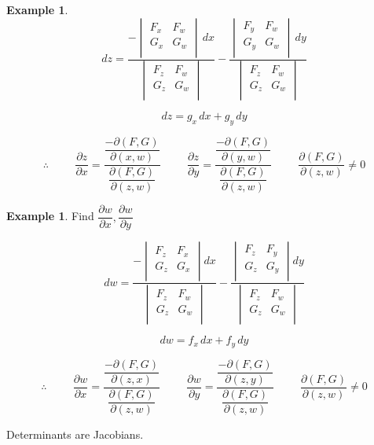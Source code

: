 \documentclass[11pt,a4paper]{article}
\theoremstyle{definition}
\newtheorem{exa}[thm]{Example}
\begin{document}
\begin{exa}
$$dz = \frac{
-\begin{vmatrix}
F_x & F_w\\
G_x & G_w\\
\end{vmatrix}
\,dx}{
\begin{vmatrix}
F_z & F_w\\
G_z & G_w\\
\end{vmatrix}
}-\frac{
\begin{vmatrix}
F_y & F_w\\
G_y & G_w\\
\end{vmatrix}
\,dy
}{
\begin{vmatrix}
F_z & F_w\\
G_z & G_w\\
\end{vmatrix}
}
$$

$$dz = g_x \,dx + g_y\,dy$$

$$\therefore\hspace{1cm} \frac{\partial z}{\partial x} = \frac{\dfrac{-\partial (F,G)}{\partial (x,w)}}{\dfrac{\partial (F,G)}{\partial (z,w)}}\hspace{1cm}
\frac{\partial z}{\partial y}= \frac{\dfrac{-\partial (F,G)}{\partial (y,w)}}{\dfrac{\partial (F,G)}{\partial (z,w)}}\hspace{1cm} \frac{\partial (F,G)}{\partial (z,w)} \neq 0$$
\end{exa}


\begin{exa}


Find $\dfrac{\partial w}{\partial x}, \dfrac{\partial w}{\partial y}$

$$dw = \frac{
-\begin{vmatrix}
F_z & F_x\\
G_z & G_x\\
\end{vmatrix}
dx}{
\begin{vmatrix}
F_z & F_w\\
G_z & G_w\\
\end{vmatrix}
}-\frac{
\begin{vmatrix}
F_z & F_y\\
G_z & G_y\\
\end{vmatrix}
dy
}{
\begin{vmatrix}
F_z & F_w\\
G_z & G_w\\
\end{vmatrix}
}
$$

$$dw = f_x\,dx + f_y \,dy$$

$$\therefore\hspace{1cm} \frac{\partial w}{\partial x} = \frac{\dfrac{-\partial (F,G)}{\partial (z,x)}}{\dfrac{\partial (F,G)}{\partial (z,w)}}\hspace{1cm}
\frac{\partial w}{\partial y}= \frac{\dfrac{-\partial (F,G)}{\partial (z,y)}}{\dfrac{\partial (F,G)}{\partial (z,w)}}\hspace{1cm} \frac{\partial (F,G)}{\partial (z,w)} \neq 0$$

Determinants are Jacobians.
\end{exa}
\end{document}
